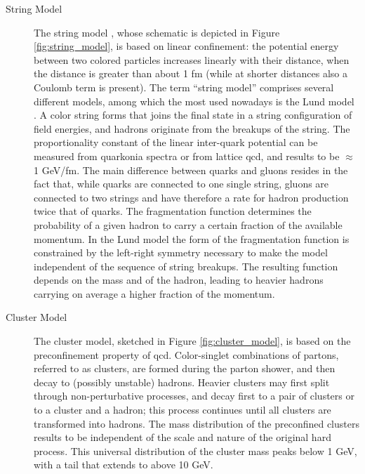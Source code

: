 \begin{description}
\item[String Model] The string model \cite{Artru:1974hr}, whose schematic is depicted in Figure \ref{fig:string_model}, is based on linear confinement: the potential energy between two colored particles increases linearly with their distance, when the distance is greater than about 1 fm (while at shorter distances also a Coulomb term is present). The term ``string model'' comprises several different models, among which the most used nowadays is the Lund model \cite{Andersson:1983ia,Andersson:1998tv}. 
A color string forms that joins the final state in a string configuration of field energies, and hadrons originate from the breakups of the string. The proportionality constant of the linear inter-quark potential can be measured from quarkonia spectra or from lattice \gls{qcd}, and results to be $\approx$ 1 GeV/fm.
The main difference between quarks and gluons resides in the fact that, while quarks are connected to one single string, gluons are connected to two strings and have therefore a rate for hadron production twice that of quarks. 
The fragmentation function determines the probability of a given hadron to carry a certain fraction of the available momentum. In the Lund model the form of the fragmentation function is constrained by the left-right symmetry necessary to make the model independent of the sequence of string breakups. The resulting function depends on the mass and \pt of the hadron, leading to heavier hadrons carrying on average a higher fraction of the momentum.

\item[Cluster Model] The cluster model, sketched in Figure \ref{fig:cluster_model}, is based on the preconfinement property of \gls{qcd}. 
Color-singlet combinations of partons, referred to as clusters, are formed during the parton shower,  
and then decay to (possibly unstable) hadrons. 
Heavier clusters may first split through non-perturbative processes, and decay first to a pair of clusters or to a cluster and a hadron; 
this process continues until all clusters are transformed into hadrons. 
The mass distribution of the preconfined clusters results to be independent of the scale and nature of the original hard process. This universal distribution of the cluster mass peaks below 1 GeV, with a tail that extends to above 10 GeV.

\end{description}

